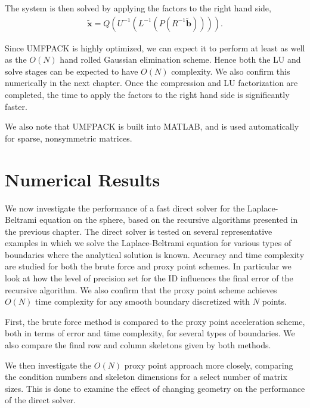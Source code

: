 \documentclass{sfuthesis}
\begin{document}
The system is then solved by applying the factors to the right hand side, 
\begin{align*}
	\widetilde{\mathbf{x}}=Q(U^{-1}(L^{-1}(P(R^{-1}\widetilde{\mathbf{b}})))).
\end{align*}

Since UMFPACK is highly optimized, we can expect it to perform at least as well as the $O(N)$ hand rolled Gaussian elimination scheme. Hence both the LU and solve stages can be expected to have $O(N)$ complexity. We also confirm this numerically in the next chapter. Once the compression and LU factorization are completed, the time to apply the factors to the right hand side is significantly faster. 

We also note that UMFPACK is built into MATLAB, and is used automatically for sparse, nonsymmetric matrices. 

\chapter{Numerical Results}
\label{four}

We now investigate the performance of a fast direct solver for the Laplace-Beltrami equation on the sphere, based on the recursive algorithms presented in the previous chapter. The direct solver is tested on several representative examples in which we solve the Laplace-Beltrami equation for various types of boundaries where the analytical solution is known. Accuracy and time complexity are studied for both the brute force and proxy point schemes. In particular we look at how the level of precision set for the ID influences the final error of the recursive algorithm. We also confirm that the proxy point scheme achieves $O(N)$ time complexity for any smooth boundary discretized with $N$ points. 

First, the brute force method is compared to the proxy point acceleration scheme, both in terms of error and time complexity, for several types of boundaries. We also compare the final row and column skeletons given by both methods. 

We then investigate the $O(N)$ proxy point approach more closely, comparing the condition numbers and skeleton dimensions for a select number of matrix sizes. This is done to examine the effect of changing geometry on the performance of the direct solver. 
\end{document}
